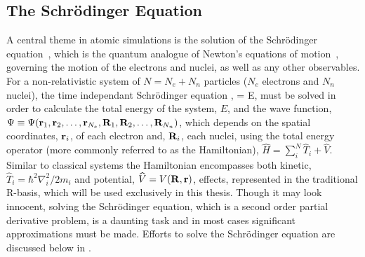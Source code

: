 \subsection{The Schr\"odinger Equation}
\label{sec:scrodinger}

A central theme in atomic simulations is the solution of the Schr\"odinger equation~\cite{schrodinger-equation-1926}, which is the quantum analogue of Newton's equations of motion~\cite{newton-latin}, governing the motion of the electrons and nuclei, as well as any other observables.
For a non-relativistic system of $N = N_e + N_n$ particles ($N_e$ electrons and $N_n$ nuclei), the time independant Schr\"odinger equation ,
 \Psi = E\Psi,
\eeq
must be solved in order to calculate the total energy of the system, $E$, and the wave function, $\Psi \equiv \Psi({\mathrm{\mathbf{\bm{r}}}}_1, {\mathrm{\mathbf{\bm{r}}}}_2, \ldots, {\mathrm{\mathbf{\bm{r}}}}_{N_e}, {\mathrm{\mathbf{\bm{R}}}}_1, {\mathrm{\mathbf{\bm{R}}}}_2, \ldots, {\mathrm{\mathbf{\bm{R}}}}_{N_n})$, which depends on the spatial coordinates, ${\mathrm{\mathbf{\bm{r}}}}_i$, of each electron and, ${\mathrm{\mathbf{\bm{R}}}}_i$, each nuclei, using the total energy operator (more commonly referred to as the Hamiltonian), $\widehat{H} = \sum_i^{N}\widehat{T}_i  + \widehat{V}$.
Similar to classical systems the Hamiltonian encompasses both kinetic, $\widehat{T}_i = \hbar^2\nabla_i^2/2m_i$ and potential, $\widehat{V} = V({\mathrm{\mathbf{\bm{R}}}}, {\mathrm{\mathbf{\bm{r}}}})$, effects, represented in the traditional R-basis, which will be used exclusively in this thesis.
Though it may look innocent, solving the Schr\"odinger equation, which is a second order partial derivative problem, is a daunting task and in most cases significant approximations must be made.
Efforts to solve the Schr\"odinger equation are discussed below in .
